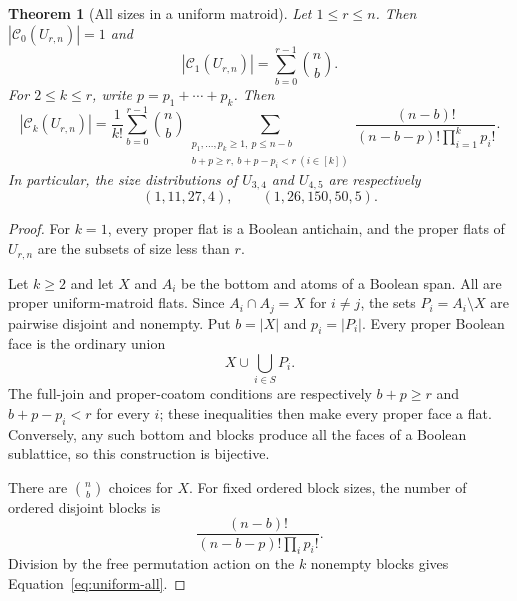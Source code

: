 \documentclass[11pt]{article}
\newtheorem{theorem}{Theorem}[section]
\theoremstyle{definition}
\theoremstyle{remark}
\newcommand{\cC}{\mathcal C}
\begin{document}
\begin{theorem}[All sizes in a uniform matroid]\label{thm:uniform-all}
Let $1\le r\le n$.  Then $|\cC_0(U_{r,n})|=1$ and
\[
 |\cC_1(U_{r,n})|=\sum_{b=0}^{r-1}\binom nb.
\]
For $2\le k\le r$, write $p=p_1+\cdots+p_k$.  Then
\begin{equation}\label{eq:uniform-all}
 \boxed{
 |\cC_k(U_{r,n})|
 =\frac1{k!}\sum_{b=0}^{r-1}\binom nb
 \sum_{\substack{p_1,\ldots,p_k\ge1,\ p\le n-b\\
                   b+p\ge r,\ b+p-p_i<r\ (i\in[k])}}
 \frac{(n-b)!}{(n-b-p)!\prod_{i=1}^k p_i!}.}
\end{equation}
In particular, the size distributions of $U_{3,4}$ and $U_{4,5}$ are
respectively
\[
 (1,11,27,4),\qquad (1,26,150,50,5).
\]
\end{theorem}

\begin{proof}
For $k=1$, every proper flat is a Boolean antichain, and the proper flats of
$U_{r,n}$ are the subsets of size less than $r$.

Let $k\ge2$ and let $X$ and $A_i$ be the bottom and atoms of a Boolean span.
All are proper uniform-matroid flats.  Since $A_i\cap A_j=X$ for $i\ne j$,
the sets $P_i=A_i\setminus X$ are pairwise disjoint and nonempty.  Put
$b=|X|$ and $p_i=|P_i|$.  Every proper Boolean face is the ordinary union
\[
 X\cup\bigcup_{i\in S}P_i.
\]
The full-join and proper-coatom conditions are respectively
$b+p\ge r$ and $b+p-p_i<r$ for every $i$; these inequalities then make every
proper face a flat.  Conversely, any such bottom and blocks produce
all the faces of a Boolean sublattice, so this construction is bijective.

There are $\binom nb$ choices for $X$.  For fixed ordered block sizes, the
number of ordered disjoint blocks is
\[
 \frac{(n-b)!}{(n-b-p)!\prod_i p_i!}.
\]
Division by the free permutation action on the $k$ nonempty blocks gives
Equation~\eqref{eq:uniform-all}.
\end{proof}
\end{document}
